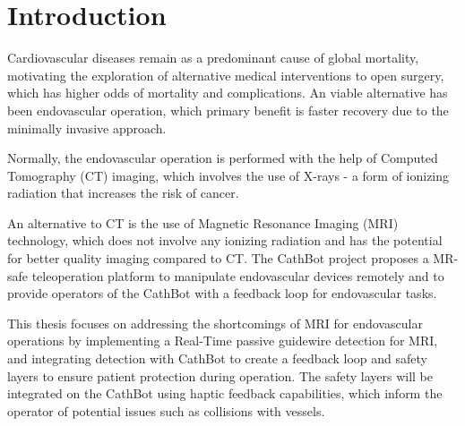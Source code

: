 \chapter{Introduction}
\label{ch:intro}
Cardiovascular diseases remain as a predominant cause of global mortality, motivating the exploration of alternative medical interventions to open surgery, which has higher odds of mortality and complications. An viable alternative has been endovascular operation, which primary benefit is faster recovery due to the minimally invasive approach. 

Normally, the endovascular operation is performed with the help of Computed Tomography (CT) imaging, which involves the use of X-rays - a form of ionizing radiation that increases the risk of cancer. 


An alternative to CT is the use of Magnetic Resonance Imaging (MRI) technology, which does not involve any ionizing radiation and has the potential for better quality imaging compared to CT. The CathBot project proposes a MR-safe teleoperation platform to manipulate endovascular devices remotely and to provide operators of the CathBot with a feedback loop for endovascular tasks. 

This thesis focuses on addressing the shortcomings of MRI for endovascular operations by implementing a Real-Time passive guidewire detection for MRI, and integrating detection with CathBot to create a feedback loop and safety layers to ensure patient protection during operation. The safety layers will be integrated on the CathBot using haptic feedback capabilities, which inform the operator of potential issues such as collisions with vessels.